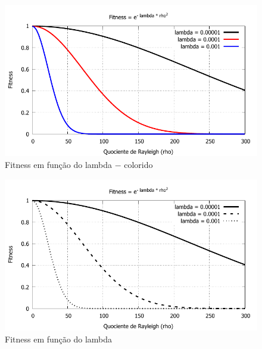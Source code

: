	
	\begin{figure}[pt]
	\centering
		\includegraphics{figs/varios-fits-color.pdf}
	\caption{Fitness em função do lambda $-$ colorido}
	\label{fig:varios-fits-color}
\end{figure}

\begin{figure}[pb]
	\centering
		\includegraphics{figs/varios-fits-mono.pdf}
	\caption{Fitness em função do lambda}
	\label{fig:varios-fits-mono}
\end{figure}